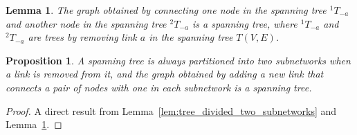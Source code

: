 \documentclass[10pt,a4paper]{amsart}
\newtheorem{lemma}{Lemma}
\newtheorem{proposition}{Proposition}
\begin{document}
\begin{lemma}
  The graph obtained by connecting one node in the spanning tree ${^1}T_{-a}$  and another node in the spanning tree ${^2}T_{-a}$  is a spanning tree, where ${^1}T_{-a}$  and ${^2}T_{-a}$  are trees by removing link $a$ in the spanning tree $T\left(V,E\right)$.
  \label{lem:connected_graph_is_tree}
\end{lemma}

\begin{proposition}
  A spanning tree is always partitioned into two subnetworks when a link is removed from it, and the graph obtained by adding a new link that connects a pair of nodes with one in each subnetwork is a spanning tree.
  \label{prop:swapping_procedure}
\end{proposition}

\begin{proof}
  A direct result from Lemma~\ref{lem:tree_divided_two_subnetworks} and Lemma~\ref{lem:connected_graph_is_tree}.
\end{proof}
\end{document}
